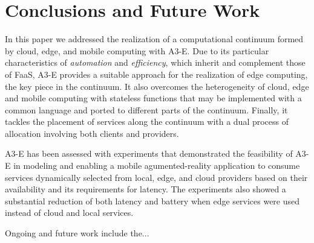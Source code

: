\section{Conclusions and Future Work}\label{sec:conclusions}

In this paper we addressed the realization of a computational continuum formed by cloud, edge, and mobile computing with A3-E. Due to its particular characteristics of \textit{automation} and \textit{efficiency}, which inherit and complement those of FaaS, A3-E provides a suitable approach for the realization of edge computing, the key piece in the continuum. It also overcomes the heterogeneity of cloud, edge and mobile computing with stateless functions that may be implemented with a common language and ported to different parts of the continuum. Finally, it tackles the placement of services along the continuum with a dual process of allocation involving both clients and providers.

A3-E has been assessed with experiments that demonstrated the feasibility of A3-E in modeling and enabling a mobile agumented-reality application to consume services dynamically selected from local, edge, and cloud providers based on their availability and its requirements for latency. The experiments also showed a substantial reduction of both latency and battery when edge services were used instead of cloud and local services. 

Ongoing and future work include the...

 